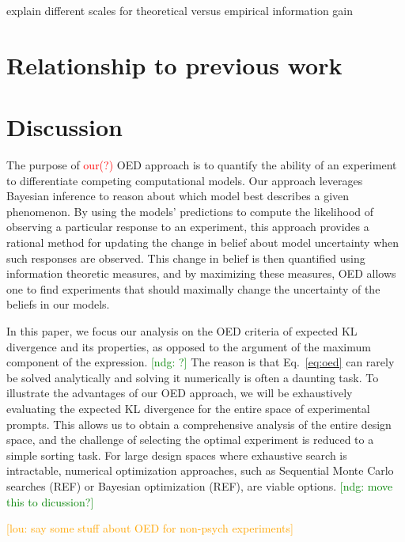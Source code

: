 \documentclass{article}
\newcommand{\red}[1]{\textcolor{Red}{#1}}
\newcommand{\ndg}[1]{\textcolor{Green}{[ndg: #1]}}
\newcommand{\lou}[1]{\textcolor{orange}{[lou: #1]}}
\newcommand{\cas}[1]{ \textsf{\color{darkgray} \scriptsize #1} }
\begin{document}
\cas{explain different scales for theoretical versus empirical information gain}

\section{Relationship to previous work}
\section{Discussion}

The purpose of \red{our(?)} OED approach is to quantify the ability of an experiment to differentiate competing computational models. Our approach leverages Bayesian inference to reason about which model best describes a given phenomenon. By using the models' predictions to compute the likelihood of observing a particular response to an experiment, this approach provides a rational method for updating the change in belief about model uncertainty when such responses are observed. This change in belief is then quantified using information theoretic measures, and by maximizing these measures, OED allows one to find experiments that should maximally change the uncertainty of the beliefs in our models.


In this paper, we focus our analysis on the OED criteria of expected KL divergence and its properties, as opposed to the argument of the maximum component of the expression. \ndg{?} The reason is that Eq.~\ref{eq:oed} can rarely be solved analytically and solving it numerically is often a daunting task. To illustrate the advantages of our OED approach, we will be exhaustively evaluating the expected KL divergence for the entire  space of experimental prompts. This allows us to obtain a comprehensive analysis of the entire design space, and the challenge of selecting the optimal experiment is reduced to a simple sorting task. For large design spaces where exhaustive search is intractable, numerical optimization approaches, such as Sequential Monte Carlo searches (REF) or Bayesian optimization (REF), are viable options.  \ndg{move this to dicussion?}



\lou{say some stuff about OED for non-psych experiments}



\end{document}
